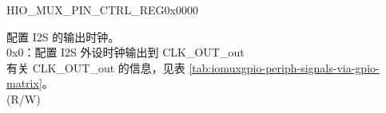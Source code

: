 \begin{register}{H}{IO\_MUX\_PIN\_CTRL\_REG}{0x0000}\label{regdesc:IOMUXPINCTRLREG}
%
%
%
%
\regnewline%
\begin{regdesc}\begin{reglist}
\label{fielddesc:IOMUXCLKOUT1}\item [IO\_MUX\_CLK\_OUT\regindex{x}] 配置 I2S 的输出时钟。\\
0x0：配置 I2S 外设时钟输出到 CLK\_OUT\_out\\
有关 CLK\_OUT\_out 的信息，见表 \ref{tab:iomuxgpio-periph-signals-via-gpio-matrix}。 \\(R/W)
\end{reglist}\end{regdesc}
\end{register}


